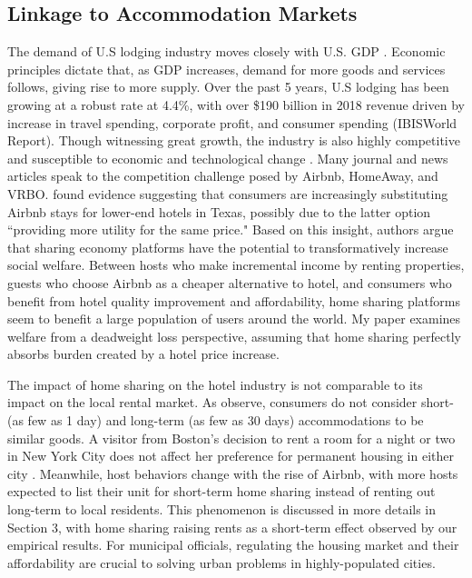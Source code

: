 \documentclass[12pt]{article}
\begin{document}
		\subsection{Linkage to Accommodation Markets}
			The demand of U.S lodging industry moves closely with U.S. GDP \citep{wheaton1999real}. Economic principles dictate that, as GDP increases, demand for more goods and services follows, giving rise to more supply. Over the past 5 years, U.S lodging has been growing at a robust rate at 4.4\%, with over \$190 billion in 2018 revenue driven by increase in travel spending, corporate profit, and consumer spending (IBISWorld Report). Though witnessing great growth, the industry is also highly competitive and susceptible to economic and technological change \citep{kalnins2006markets}. Many journal and news articles speak to the competition challenge posed by Airbnb, HomeAway, and VRBO. \citet{zervas2017rise} found evidence suggesting that consumers are increasingly substituting Airbnb stays for lower-end hotels in Texas, possibly due to the latter option “providing more utility for the same price." Based on this insight, authors argue that sharing economy platforms have the potential to transformatively increase social welfare. Between hosts who make incremental income by renting properties, guests who choose Airbnb as a cheaper alternative to hotel, and consumers who benefit from hotel quality improvement and affordability, home sharing platforms seem to benefit a large population of users around the world. My paper examines welfare from a deadweight loss perspective, assuming that home sharing perfectly absorbs burden created by a hotel price increase.
			
			\par
			The impact of home sharing on the hotel industry is not comparable to its impact on the local rental market. As \citet{horn2017home} observe, consumers do not consider short- (as few as 1 day) and long-term (as few as 30 days) accommodations to be similar goods. A visitor from Boston's decision to rent a room for a night or two in New York City does not affect her preference for permanent housing in either city \citep{horn2017home}. Meanwhile, host behaviors change with the rise of Airbnb, with more hosts expected to list their unit for short-term home sharing instead of renting out long-term to local residents. This phenomenon is discussed in more details in Section 3, with home sharing raising rents as a short-term effect observed by our empirical results. For municipal officials, regulating the housing market and their affordability are crucial to solving urban problems in highly-populated cities.
			
\end{document}
